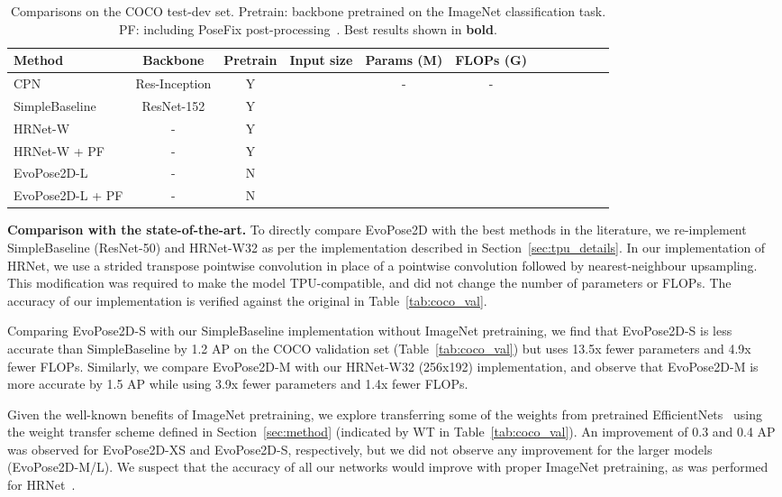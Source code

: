 \documentclass[final]{cvpr}
\begin{document}
\begin{table*}[t]
\footnotesize
\centering
\begin{tabular}{l|c|c|c|c|c|c|ccccc}
\hline
Method & Backbone & Pretrain & Input size & Params (M) & FLOPs (G) & 
 &  &  &  &  &  \\
\hline
CPN~\cite{chen2018cascaded}& Res-Inception & Y &  & - & - &
&&&&&\\ 
SimpleBaseline~\cite{xiao2018simple} & ResNet-152 & Y &  & &
& & &&&&\\
HRNet-W~\cite{sun2019deep} & -  & Y & &   & & &&&&&\\
HRNet-W + PF~\cite{moon2019posefix} & - & Y &  &   & & &&&&&\\
\hline
EvoPose2D-L & - & N & & &
& & &&&&\\
EvoPose2D-L + PF & - &  N &  & &
& & &&&&\\
\hline
\end{tabular}
\vspace{-2pt}
\caption{Comparisons on the COCO test-dev set. Pretrain: backbone pretrained on the ImageNet classification task. PF: including PoseFix post-processing~\cite{moon2019posefix}. Best results shown in \textbf{bold}.}
\vspace{-6pt}
\label{tab:coco_test}
\end{table*}

\medskip\noindent\textbf{Comparison with the state-of-the-art.} To directly compare EvoPose2D with the best methods in the literature, we re-implement SimpleBaseline (ResNet-50) and HRNet-W32 as per the implementation described in Section~\ref{sec:tpu_details}. In our implementation of HRNet, we use a strided transpose pointwise convolution in place of a pointwise convolution followed by nearest-neighbour upsampling. This modification was required to make the model TPU-compatible, and did not change the number of parameters or FLOPs. The accuracy of our implementation is verified against the original in Table~\ref{tab:coco_val}. 

Comparing EvoPose2D-S with our SimpleBaseline implementation without ImageNet pretraining, we find that EvoPose2D-S is less accurate than SimpleBaseline by 1.2 AP on the COCO validation set (Table~\ref{tab:coco_val}) but uses 13.5x fewer parameters and 4.9x fewer FLOPs. Similarly, we compare EvoPose2D-M with our HRNet-W32 (256x192) implementation, and observe that EvoPose2D-M is more accurate by 1.5 AP while using 3.9x fewer parameters and 1.4x fewer FLOPs. 

Given the well-known benefits of ImageNet pretraining, we explore transferring some of the weights from pretrained EfficientNets~\cite{tan2019efficientnet} using the weight transfer scheme defined in Section~\ref{sec:method} (indicated by WT in Table~\ref{tab:coco_val}). An improvement of 0.3 and 0.4 AP was observed for EvoPose2D-XS and EvoPose2D-S, respectively, but we did not observe any improvement for the larger models (EvoPose2D-M/L). We suspect that the accuracy of all our networks would improve with proper ImageNet pretraining, as was performed for HRNet~\cite{sun2019deep}. 
\end{document}

